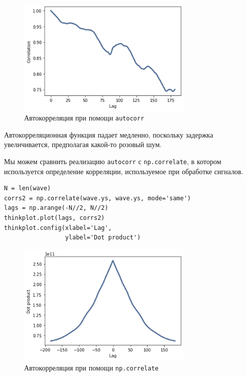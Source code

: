 \documentclass[a4paper,12pt]{report}
\begin{document}
\begin{figure}[H]
        \centering
        \includegraphics[width=0.75\textwidth]{lab5_fig3_3.png}
        \caption{Автокорреляция при помощи \texttt{autocorr}}
        \label{fig:lab5_fig3_3}
\end{figure}

Автокорреляционная функция падает медленно, поскольку задержка увеличивается, предполагая какой-то розовый шум.

Мы можем сравнить реализацию \texttt{autocorr} с \texttt{np.correlate}, в котором используется определение корреляции, используемое при обработке сигналов.

\begin{lstlisting}[caption=Автокорреляция при помощи \texttt{np.correlate}]
N = len(wave)
corrs2 = np.correlate(wave.ys, wave.ys, mode='same')
lags = np.arange(-N//2, N//2)
thinkplot.plot(lags, corrs2)
thinkplot.config(xlabel='Lag',
                 ylabel='Dot product')
\end{lstlisting}

\begin{figure}[H]
        \centering
        \includegraphics[width=0.75\textwidth]{lab5_fig3_4.png}
        \caption{Автокорреляция при помощи \texttt{np.correlate}}
        \label{fig:lab5_fig3_4}
\end{figure}
\end{document}
